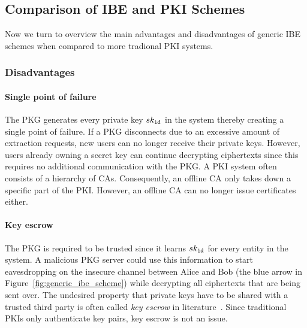 \subsection{Comparison of IBE and PKI Schemes}
\label{sec:pros_and_cons_of_ibe}
Now we turn to overview the main advantages and disadvantages of generic IBE schemes when compared to more tradional PKI systems.

\subsubsection{Disadvantages}
\paragraph{Single point of failure}
The PKG generates every private key $sk_{\mathtt{id}_{}}$ in the system thereby creating a single point of failure. If a PKG disconnects due to an excessive amount of extraction requests, new users can no longer receive their private keys. However, users already owning a secret key can continue decrypting ciphertexts since this requires no additional communication with the PKG. A PKI system often consists of a hierarchy of CAs. Consequently, an offline CA only takes down a specific part of the PKI. However, an offline CA can no longer issue certificates either.

\paragraph{Key escrow}
The PKG is required to be trusted since it learns $sk_{\mathtt{id}_{}}$ for every entity in the system. A malicious PKG server could use this information to start eavesdropping on the insecure channel between Alice and Bob (the blue arrow in Figure~\ref{fig:generic_ibe_scheme}) while decrypting all ciphertexts that are being sent over. The undesired property that private keys have to be shared with a trusted third party is often called \textit{key escrow} in literature~\cite{art:AbelsonHARBMBJBMDWGJNGRLSISB97}. Since traditional PKIs only authenticate key pairs, key escrow is not an issue.

